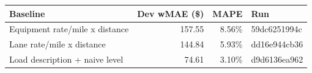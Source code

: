 \begin{tabular}{lrrl}
\toprule
Baseline & Dev wMAE (\$) & MAPE & Run \\
\midrule
Equipment rate/mile x distance & 157.55 & 8.56\% & 59dc6251994c \\
Lane rate/mile x distance & 144.84 & 5.93\% & dd16e944cb36 \\
Load description + naive level & 74.61 & 3.10\% & d9d6136ea962 \\
\bottomrule
\end{tabular}

